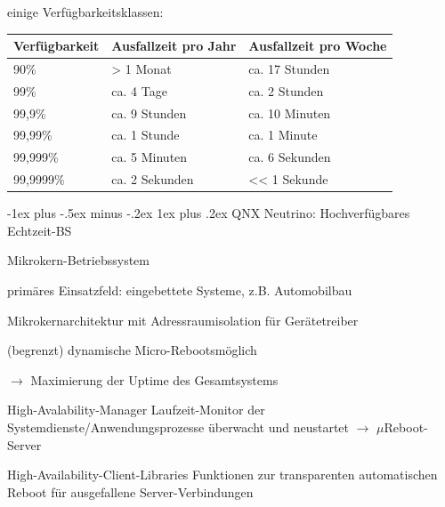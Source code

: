 \documentclass[a4paper]{article}
\makeatletter
\renewcommand{\subsubsection}{\@startsection{subsubsection}{3}{0mm}%
 {-1ex plus -.5ex minus -.2ex}%
 {1ex plus .2ex}%
 {\normalfont\small\bfseries}}
\makeatother
\begin{document}
\begin{multicols}{3}
    einige Verfügbarkeitsklassen:
    \begin{tabular}{l|l|l}
        Verfügbarkeit & Ausfallzeit pro Jahr   & Ausfallzeit pro Woche          \\\hline
        90\%          & \textgreater{} 1 Monat & ca. 17 Stunden                 \\
        99\%          & ca. 4 Tage             & ca. 2 Stunden                  \\
        99,9\%        & ca. 9 Stunden          & ca. 10 Minuten                 \\
        99,99\%       & ca. 1 Stunde           & ca. 1 Minute                   \\
        99,999\%      & ca. 5 Minuten          & ca. 6 Sekunden                 \\
        99,9999\%     & ca. 2 Sekunden         & \textless\textless{} 1 Sekunde
    \end{tabular}

    \subsubsection{QNX Neutrino: Hochverfügbares Echtzeit-BS}
    \begin{itemize*}
        \item Mikrokern-Betriebssystem
        \item primäres Einsatzfeld: eingebettete Systeme, z.B. Automobilbau
        \item Mikrokernarchitektur mit Adressraumisolation für Gerätetreiber
        \item (begrenzt) dynamische Micro-Rebootsmöglich
        \item $\rightarrow$ Maximierung der Uptime des Gesamtsystems
    \end{itemize*}
    \begin{description*}
        \item[High-Avalability-Manager] Laufzeit-Monitor der Systemdienste/Anwendungsprozesse überwacht und neustartet $\rightarrow$ $\mu$Reboot-Server
        \item[High-Availability-Client-Libraries] Funktionen zur transparenten automatischen Reboot für ausgefallene Server-Verbindungen
    \end{description*}


\end{multicols}
\end{document}
